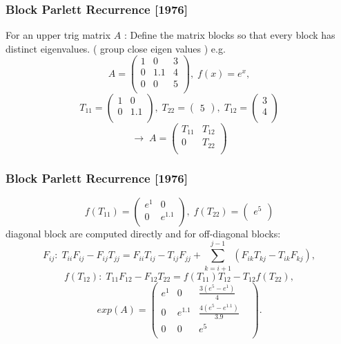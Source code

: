\begin{frame}
\frametitle{Block Parlett Recurrence [1976]}
For an upper trig matrix $A$ : \newline
Define the matrix blocks so that every block has distinct eigenvalues. ( group close eigen values ) e.g.
\[
A = \begin{pmatrix}
    1 & 0 & 3 \\
    0 & 1.1 & 4 \\
    0 & 0 & 5 \\
\end{pmatrix} ,\;
 f(x) =e^x,
\]
\[
T_{11} = \begin{pmatrix}
    1 & 0 \\
    0 & 1.1 \\
\end{pmatrix} , \; 
T_{22} =\begin{pmatrix}
5
\end{pmatrix} , \;
T_{12} = \begin{pmatrix}
    3 \\
    4 \\
\end{pmatrix}
\]
\[
\longrightarrow \;
A = \begin{pmatrix}
T_{11} & T_{12} \\
0      & T_{22} \\
\end{pmatrix}
\]

\end{frame}

\begin{frame}
\frametitle{Block Parlett Recurrence [1976]}
\[
f(T_{11}) = \begin{pmatrix}
            e^1 & 0 \\
            0   & e^{1.1} \\
\end{pmatrix} , \; f(T_{22}) = \begin{pmatrix}
    e^5\\
\end{pmatrix}
\]
diagonal block are computed directly and for off-diagonal blocks:
\[
F_{ij}: \; T_{ii}F_{ij} - F_{ij}T_{jj} =F_{ii}T_{ij} -T_{ij}F_{jj} + \sum _{k = i+1} ^ {j-1} (F_{ik}T_{kj} - T_{ik}F_{kj}),
\]\newline
\[
f(T_{12}): \; T_{11}F_{12} - F_{12}T_{22} = f(T_{11})T_{12} - T_{12}f(T_{22}),
\]
\[
exp(A) = \begin{pmatrix}
e^1 & 0 & \frac {3(e^5-e^1)} {4}& \\
0   & e^{1.1} & \frac {4(e^5-e^{1.1})} {3.9} \\
0 & 0 & e^5\\
\end{pmatrix} .
\]
\end{frame}

